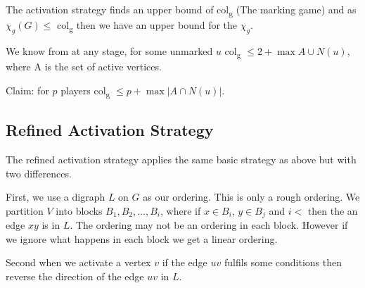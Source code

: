 The activation strategy finds an upper bound of col\textsubscript{g} (The marking game) and as $\chi_g(G) \leq$ col\textsubscript{g} then we have an upper bound for the $\chi_g$. 

We know from \cite{Zhu2008} at any stage, for some unmarked $u$ col\textsubscript{g} $\leq 2 + \max{A \cup N(u)}$, where A is the set of active vertices.

Claim: for $p$ players col\textsubscript{g} $\leq p + \max{ \left| A \cap N(u)\right| }$. 

\subsection{Refined Activation Strategy}
The refined activation strategy applies the same basic strategy as above but with two differences. 

First, we use a digraph $L$ on $G$ as our ordering. This is only a rough ordering. We partition $V$ into blocks $B_1,B_2,\dots,B_i$, where if $x \in B_i$, $y \in B_j$ and $i <$ then the an edge $xy$ is in $L$. The ordering may not be an ordering in each block. However if we ignore what happens in each block we get a linear ordering.

Second when we activate a vertex $v$ if the edge $uv$ fulfils some conditions then reverse the direction of the edge $uv$ in $L$.




















